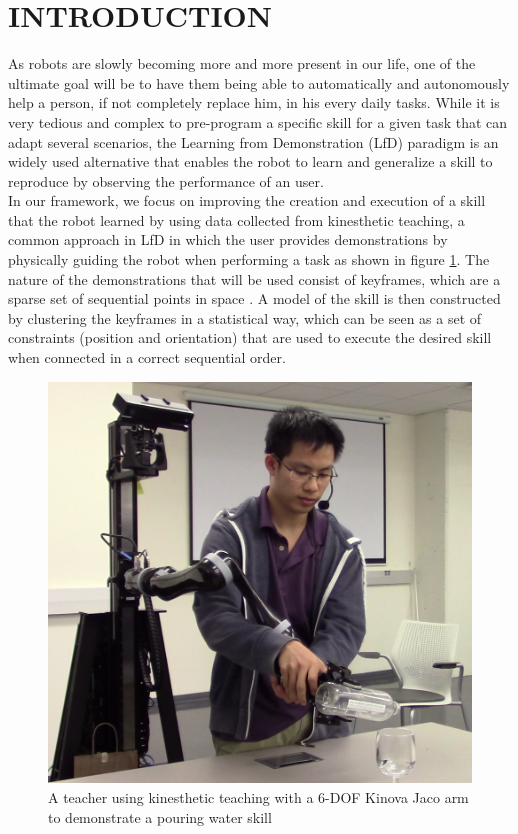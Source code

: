 \documentclass[letterpaper, 10 pt, conference]{ieeeconf}  %
\begin{document}
\section{INTRODUCTION}
As robots are slowly becoming more and more present in our life, one of the ultimate goal will be to have them being able to automatically and autonomously help a person, if not completely replace him, in his every daily tasks.   
While it is very tedious and complex to pre-program a specific skill for a given task that can adapt several scenarios, the Learning from Demonstration (LfD) paradigm is an widely used alternative that enables the robot to learn and generalize a skill to reproduce by observing the performance of an user.\\
In our framework, we focus on improving the creation and execution of a skill that the robot learned by using data collected from kinesthetic teaching, a common approach in LfD in which the user provides demonstrations by physically guiding the robot when performing a task as shown in figure \ref{Pic_kinesthetik_teaching}. The nature of the demonstrations that will be used consist of keyframes, which are a sparse set of sequential points in space\cite{refKeyframe1} \cite{refKeyframe2}\cite{refKeyframe0}.
A model of the skill is then constructed by clustering the keyframes in a statistical way, which can be seen as a set of constraints (position and orientation) that are used to execute the desired skill when connected in a correct sequential order. \\

\begin{figure}[ht]
	\centering
	\includegraphics[scale=0.245]{figure/kinesthetic_teaching.png}
	\caption{A teacher using kinesthetic teaching with a 6-DOF Kinova Jaco arm to demonstrate a pouring water skill}
	\label{Pic_kinesthetik_teaching}
\end{figure}
\end{document}
